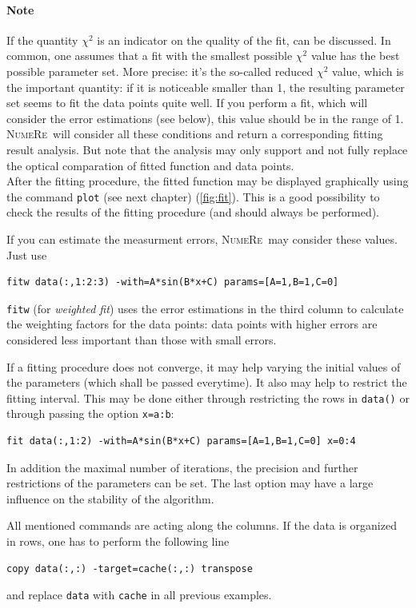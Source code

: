 \documentclass[DIV=14,headsepline,footsepline]{scrbook}
\newcommand{\NR}{\textsc{Nu\-me\-Re}}
\begin{document}
				
				\paragraph{Note}
					If the quantity $\chi^2$ is an indicator on the quality of the fit, can be discussed. In common, one assumes that a fit with the smallest possible $\chi^2$ value has the best possible parameter set. More precise: it's the so-called reduced $\chi^2$ value, which is the important quantity: if it is noticeable smaller than 1, the resulting parameter set seems to fit the data points quite well. If you perform a fit, which will consider the error estimations (see below), this value should be in the range of 1. \NR\ will consider all these conditions and return a corresponding fitting result analysis. But note that the analysis may only support and not fully replace the optical comparation of fitted function and data points.\bigskip\\
				After the fitting procedure, the fitted function may be displayed graphically using the command \lstinline+plot+ (see next chapter) (\autoref{fig:fit}). This is a good possibility to check the results of the fitting procedure (and should always be performed).
				
				If you can estimate the measurment errors, \NR\ may consider these values. Just use
				\begin{lstlisting}
fitw data(:,1:2:3) -with=A*sin(B*x+C) params=[A=1,B=1,C=0]
				\end{lstlisting}
				\lstinline+fitw+ (for \emph{weighted fit}) uses the error estimations in the third column to calculate the weighting factors for the data points: data points with higher errors are considered less important than those with small errors.
				
				If a fitting procedure does not converge, it may help varying the initial values of the parameters (which shall be passed everytime). It also may help to restrict the fitting interval. This may be done either through restricting the rows in \lstinline+data()+ or through passing the option \lstinline+x=a:b+:
				\begin{lstlisting}
fit data(:,1:2) -with=A*sin(B*x+C) params=[A=1,B=1,C=0] x=0:4
				\end{lstlisting}
				In addition the maximal number of iterations, the precision and further restrictions of the parameters can be set. The last option may have a large influence on the stability of the algorithm.
				
				All mentioned commands are acting along the columns. If the data is organized in rows, one has to perform the following line
				\begin{lstlisting}
copy data(:,:) -target=cache(:,:) transpose
				\end{lstlisting}
				and replace \lstinline+data+ with \lstinline+cache+ in all previous examples.
\end{document}
